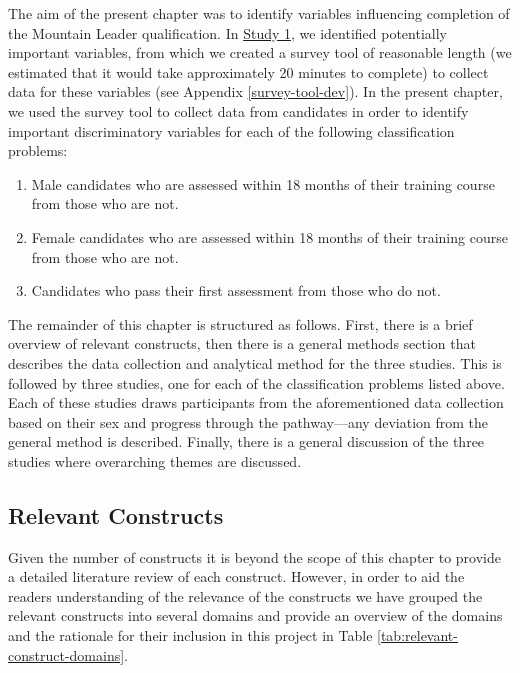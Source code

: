 \documentclass[
  12pt,
  a4paper,
]{book}
\providecommand{\tightlist}{%
  \setlength{\itemsep}{0pt}\setlength{\parskip}{0pt}}
\begin{document}
The aim of the present chapter was to identify variables influencing completion of the Mountain Leader qualification. In \protect\hyperlink{ml-qualitative}{Study 1}, we identified potentially important variables, from which we created a survey tool of reasonable length (we estimated that it would take approximately 20 minutes to complete) to collect data for these variables (see Appendix \ref{survey-tool-dev}). In the present chapter, we used the survey tool to collect data from candidates in order to identify important discriminatory variables for each of the following classification problems:

\begin{enumerate}
\def\labelenumi{\arabic{enumi}.}
\tightlist
\item
  Male candidates who are assessed within 18 months of their training course from those who are not.
\item
  Female candidates who are assessed within 18 months of their training course from those who are not.
\item
  Candidates who pass their first assessment from those who do not.
\end{enumerate}

The remainder of this chapter is structured as follows. First, there is a brief overview of relevant constructs, then there is a general methods section that describes the data collection and analytical method for the three studies. This is followed by three studies, one for each of the classification problems listed above. Each of these studies draws participants from the aforementioned data collection based on their sex and progress through the pathway---any deviation from the general method is described. Finally, there is a general discussion of the three studies where overarching themes are discussed.

\hypertarget{pra-relevant-constructs}{%
\subsection{Relevant Constructs}\label{pra-relevant-constructs}}

Given the number of constructs it is beyond the scope of this chapter to provide a detailed literature review of each construct. However, in order to aid the readers understanding of the relevance of the constructs we have grouped the relevant constructs into several domains and provide an overview of the domains and the rationale for their inclusion in this project in Table \ref{tab:relevant-construct-domains}.
\end{document}
